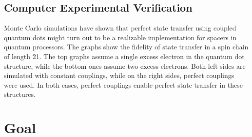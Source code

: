 \subsection{Computer Experimental Verification}

\begin{center}
\end{center}

\noindent Monte Carlo simulations have shown that perfect state transfer using coupled quantum dots might turn out to be a realizable implementation for spacers in quantum processors. The graphs show the fidelity of state transfer in a spin chain of length 21. The top graphs assume a single excess electron in the quantum dot structure, while the bottom ones assume two excess electrons. Both left sides are simulated with constant couplings, while on the right sides, perfect couplings were used. In both cases, perfect couplings enable perfect state transfer in these structures. 

\section{Goal}

